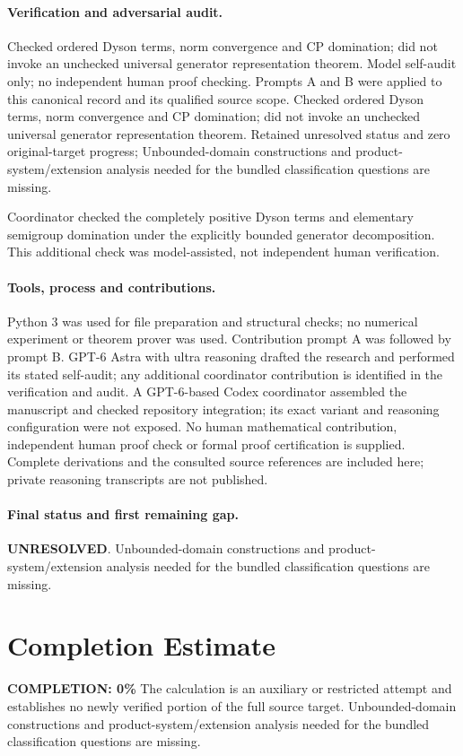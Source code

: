 \documentclass[11pt]{article}
\begin{document}
\paragraph{Verification and adversarial audit.}
Checked ordered Dyson terms, norm convergence and CP domination; did not invoke an unchecked universal generator representation theorem. Model self-audit only; no independent human proof checking. Prompts A and B were applied to this canonical record and its qualified source scope. Checked ordered Dyson terms, norm convergence and CP domination; did not invoke an unchecked universal generator representation theorem. Retained unresolved status and zero original-target progress; Unbounded-domain constructions and product-system/extension analysis needed for the bundled classification questions are missing.

Coordinator checked the completely positive Dyson terms and elementary semigroup domination under the explicitly bounded generator decomposition. This additional check was model-assisted, not independent human verification.

\paragraph{Tools, process and contributions.}
Python 3 was used for file preparation and structural checks; no numerical experiment or theorem prover was used. Contribution prompt A was followed by prompt B. GPT-6 Astra with ultra reasoning drafted the research and performed its stated self-audit; any additional coordinator contribution is identified in the verification and audit. A GPT-6-based Codex coordinator assembled the manuscript and checked repository integration; its exact variant and reasoning configuration were not exposed. No human mathematical contribution, independent human proof check or formal proof certification is supplied. Complete derivations and the consulted source references are included here; private reasoning transcripts are not published.

\paragraph{Final status and first remaining gap.}
\textbf{UNRESOLVED}. Unbounded-domain constructions and product-system/extension analysis needed for the bundled classification questions are missing.

\section{Completion Estimate}
\noindent\textbf{COMPLETION: 0\%}
The calculation is an auxiliary or restricted attempt and establishes no newly verified portion of the full source target. Unbounded-domain constructions and product-system/extension analysis needed for the bundled classification questions are missing.
\end{document}
